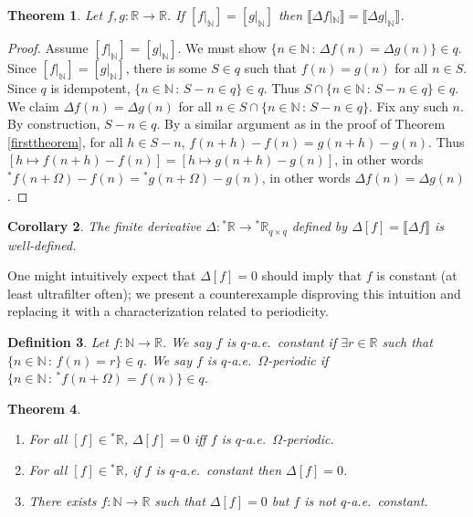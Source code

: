 \documentclass[microtype]{jloganal}
\newtheorem{theorem}{Theorem}
\newtheorem{corollary}[theorem]{Corollary}
\newtheorem{definition}[theorem]{Definition}
\begin{document}
\begin{theorem}
\label{secondmainthm}
    Let $f,g:\mathbb R\to\mathbb R$.
    If $[f|_\mathbb N]=[g|_\mathbb N]$ then
    $\llbracket\Delta f|_\mathbb N\rrbracket
    =\llbracket\Delta g|_\mathbb N\rrbracket$.
\end{theorem}

\begin{proof}
    Assume $[f|_\mathbb N]=[g|_\mathbb N]$.
    We must show $\{n\in\mathbb N\,:\,\Delta f(n)=\Delta g(n)\}\in q$.
    Since $[f|_\mathbb N]=[g|_\mathbb N]$, there is some $S\in q$ such that
    $f(n)=g(n)$ for all $n\in S$.
    Since $q$ is idempotent, $\{n\in\mathbb N\,:\,S-n\in q\}\in q$.
    Thus $S\cap \{n\in\mathbb N\,:\,S-n\in q\}\in q$.
    We claim $\Delta f(n)=\Delta g(n)$
    for all $n\in S\cap \{n\in\mathbb N\,:\,S-n\in q\}$.
    Fix any such $n$.
    By construction, $S-n\in q$.
    By a similar argument as in the proof of Theorem \ref{firsttheorem},
    for all $h\in S-n$,
    $f(n+h)-f(n)=g(n+h)-g(n)$.
    Thus $[h\mapsto f(n+h)-f(n)]=[h\mapsto g(n+h)-g(n)]$,
    in other words ${}^*f(n+\Omega)-f(n)={}^*g(n+\Omega)-g(n)$,
    in other words $\Delta f(n)=\Delta g(n)$.
\end{proof}

\begin{corollary}
\label{welldefdfinitederivcorollary}
    The finite derivative $\Delta:{}^*\mathbb R\to {}^{*}\mathbb R_{q\times q}$
    defined by $\Delta[f]=\llbracket \Delta f\rrbracket$ is well-defined.
\end{corollary}

One might intuitively expect that $\Delta[f]=0$ should imply that
$f$ is constant (at least ultrafilter often); we present
a counterexample disproving this intuition and replacing it with
a characterization related to periodicity.

\begin{definition}
    Let $f:\mathbb N\to\mathbb R$. We say $f$ is \emph{$q$-a.e.\ constant}
    if $\exists r\in \mathbb R$ such that $\{n\in\mathbb N\,:\,f(n)=r\}\in q$.
    We say $f$ is \emph{$q$-a.e.\ $\Omega$-periodic} if
    $\{n\in\mathbb N\,:\,{}^*f(n+\Omega)=f(n)\}\in q$.
\end{definition}

\begin{theorem}
\label{counterexampleflatthm}
    \begin{enumerate}
        \item For all $[f]\in{}^*\mathbb R$,
            $\Delta[f]=0$ iff $f$ is $q$-a.e.\ $\Omega$-periodic.
        \item For all $[f]\in{}^*\mathbb R$,
            if $f$ is $q$-a.e.\ constant then $\Delta[f]=0$.
        \item There exists $f:\mathbb N\to\mathbb R$ such that
            $\Delta[f]=0$ but $f$ is not $q$-a.e.\ constant.
    \end{enumerate}
\end{theorem}
\end{document}
